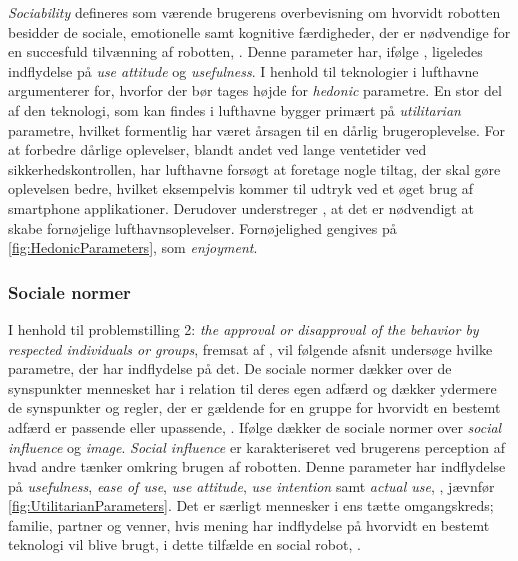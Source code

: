\textit{Sociability} defineres som værende brugerens overbevisning om hvorvidt robotten besidder de sociale, emotionelle samt kognitive færdigheder, der er nødvendige for en succesfuld tilvænning af robotten, \parencite[s. 1478]{PDF:ExploringInfluencingVariable}. Denne parameter har, ifølge \textcite[s. 1478]{PDF:ExploringInfluencingVariable}, ligeledes indflydelse på \textit{use attitude} og \textit{usefulness}.\blankline
%
I henhold til teknologier i lufthavne argumenterer \textcite[s. 352]{PDF:TheImpactOfTraveler} for, hvorfor der bør tages højde for \textit{hedonic} parametre. En stor del af den teknologi, som kan findes i lufthavne bygger primært på \textit{utilitarian} parametre, hvilket formentlig har været årsagen til en dårlig brugeroplevelse. For at forbedre dårlige oplevelser, blandt andet ved lange ventetider ved sikkerhedskontrollen, har lufthavne forsøgt at foretage nogle tiltag, der skal gøre oplevelsen bedre, hvilket eksempelvis kommer til udtryk ved et øget brug af smartphone applikationer. Derudover understreger \textcite[s. 352]{PDF:TheImpactOfTraveler}, at det er nødvendigt at skabe fornøjelige lufthavnsoplevelser. Fornøjelighed gengives på \autoref{fig:HedonicParameters}, som \textit{enjoyment}.
%

\subsubsection*{Sociale normer}
\label{InteraktionSocialeRobotterParametreSocialeNormer}
% 
I henhold til problemstilling 2: \textit{the approval or disapproval of the behavior by respected individuals or groups}, fremsat af \textcite[s. 1477]{PDF:SharingALifeHarvey}, vil følgende afsnit undersøge hvilke parametre, der har indflydelse på det.\blankline
%
De sociale normer dækker over de synspunkter mennesket har i relation til deres egen adfærd og dækker ydermere de synspunkter og regler, der er gældende for en gruppe for hvorvidt en bestemt adfærd er passende eller upassende, \parencite[s. 1478]{PDF:ExploringInfluencingVariable}. Ifølge \textcite[s. 1478]{PDF:ExploringInfluencingVariable} dækker de sociale normer over \textit{social influence} og \textit{image}. \textit{Social influence} er karakteriseret ved brugerens perception af hvad andre tænker omkring brugen af robotten. Denne parameter har indflydelse på \textit{usefulness}, \textit{ease of use}, \textit{use attitude}, \textit{use intention} samt \textit{actual use}, \parencite[s. 1478]{PDF:ExploringInfluencingVariable}, jævnfør \autoref{fig:UtilitarianParameters}. Det er særligt mennesker i ens tætte omgangskreds; familie, partner og venner, hvis mening har indflydelse på hvorvidt en bestemt teknologi vil blive brugt, i dette tilfælde en social robot, \parencite[s. 1478]{PDF:ExploringInfluencingVariable}. 

